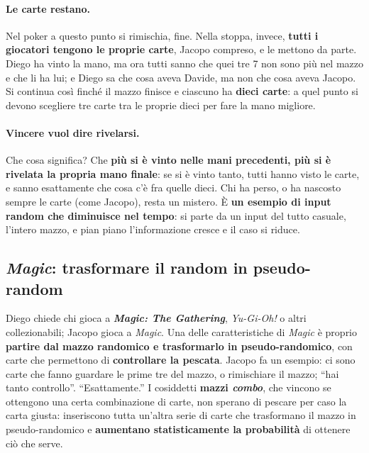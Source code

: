 \paragraph{Le carte restano.} Nel poker a questo punto si rimischia, fine. Nella stoppa,
invece, \textbf{tutti i giocatori tengono le proprie carte}, Jacopo compreso, e le mettono
da parte. Diego ha vinto la mano, ma ora tutti sanno che quei tre 7 non sono più nel mazzo e
che li ha lui; e Diego sa che cosa aveva Davide, ma non che cosa aveva Jacopo. Si continua
così finché il mazzo finisce e ciascuno ha \textbf{dieci carte}: a quel punto si devono
scegliere tre carte tra le proprie dieci per fare la mano migliore.

\paragraph{Vincere vuol dire rivelarsi.} Che cosa significa? Che \textbf{più si è vinto nelle
mani precedenti, più si è rivelata la propria mano finale}: se si è vinto tanto, tutti hanno
visto le carte, e sanno esattamente che cosa c'è fra quelle dieci. Chi ha perso, o ha
nascosto sempre le carte (come Jacopo), resta un mistero. È \textbf{un esempio di input
random che diminuisce nel tempo}: si parte da un input del tutto casuale, l'intero mazzo, e
pian piano l'informazione cresce e il caso si riduce.

\subsection{\emph{Magic}: trasformare il random in pseudo-random}

Diego chiede chi gioca a \textbf{\emph{Magic: The Gathering}}, \emph{Yu-Gi-Oh!} o altri
collezionabili; Jacopo gioca a \emph{Magic}. Una delle caratteristiche di \emph{Magic} è
proprio \textbf{partire dal mazzo randomico e trasformarlo in pseudo-randomico}, con carte che
permettono di \textbf{controllare la pescata}. Jacopo fa un esempio: ci sono carte che
fanno guardare le prime tre del mazzo, o rimischiare il mazzo; ``hai tanto controllo''.
``Esattamente.'' I cosiddetti \textbf{mazzi \emph{combo}}, che vincono se ottengono una certa
combinazione di carte, non sperano di pescare per caso la carta giusta: inseriscono tutta
un'altra serie di carte che trasformano il mazzo in pseudo-randomico e \textbf{aumentano
statisticamente la probabilità} di ottenere ciò che serve.

